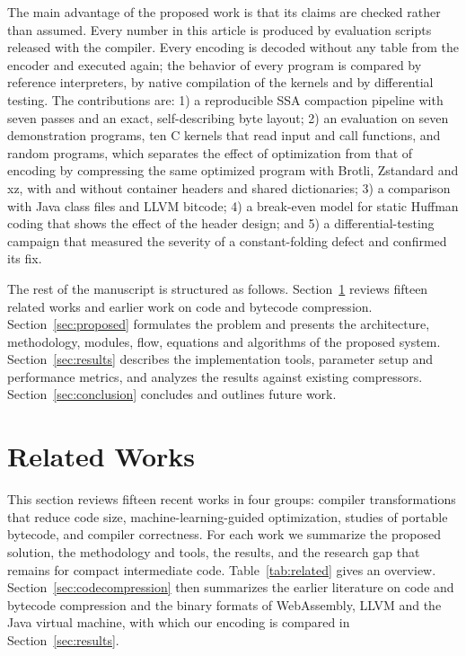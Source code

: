 \documentclass{ieeeaccess}
\begin{document}
The main advantage of the proposed work is that its claims are checked rather than assumed. Every number in this article is produced by evaluation scripts released with the compiler. Every encoding is decoded without any table from the encoder and executed again; the behavior of every program is compared by reference interpreters, by native compilation of the kernels and by differential testing. The contributions are: 1) a reproducible SSA compaction pipeline with seven passes and an exact, self-describing byte layout; 2) an evaluation on seven demonstration programs, ten C kernels that read input and call functions, and random programs, which separates the effect of optimization from that of encoding by compressing the same optimized program with Brotli, Zstandard and xz, with and without container headers and shared dictionaries; 3) a comparison with Java class files and LLVM bitcode; 4) a break-even model for static Huffman coding that shows the effect of the header design; and 5) a differential-testing campaign that measured the severity of a constant-folding defect and confirmed its fix.

The rest of the manuscript is structured as follows. Section~\ref{sec:related} reviews fifteen related works and earlier work on code and bytecode compression. Section~\ref{sec:proposed} formulates the problem and presents the architecture, methodology, modules, flow, equations and algorithms of the proposed system. Section~\ref{sec:results} describes the implementation tools, parameter setup and performance metrics, and analyzes the results against existing compressors. Section~\ref{sec:conclusion} concludes and outlines future work.

\section{Related Works}
\label{sec:related}
This section reviews fifteen recent works in four groups: compiler transformations that reduce code size, machine-learning-guided optimization, studies of portable bytecode, and compiler correctness. For each work we summarize the proposed solution, the methodology and tools, the results, and the research gap that remains for compact intermediate code. Table~\ref{tab:related} gives an overview. Section~\ref{sec:codecompression} then summarizes the earlier literature on code and bytecode compression and the binary formats of WebAssembly, LLVM and the Java virtual machine, with which our encoding is compared in Section~\ref{sec:results}.
\end{document}

